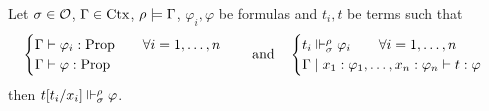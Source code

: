 \documentclass[a4paper,UKenglish,cleveref, autoref, thm-restate]{lipics-v2021}
\begin{document}
\begin{theorem}[Adequacy]\label{thm:adequacy}
  Let $\sigma \in \mathcal O$, $\Gamma \in \mathrm{Ctx}$, $\rho \models \Gamma$, $\varphi_i,\varphi$ be formulas and $t_i,t$ be terms such that
  \[\begin{cases}
  \Gamma\vdash \varphi_i : \mathrm{Prop} \qquad \forall i = 1,\ldots,n\\
  \Gamma\vdash \varphi : \mathrm{Prop}
  \end{cases}
  \quad \text{and} \quad
  \begin{cases}
  t_i \Vdash_{\sigma}^{\rho} \varphi_i \qquad \forall i = 1,\ldots,n\\
  \Gamma \mid x_1 : \varphi_1,\ldots,x_n : \varphi_n \vdash t : \varphi
  \end{cases}\]
  then $t[t_i/x_i] \Vdash_{\sigma}^{\rho} \varphi$.
\end{theorem}
\end{document}
